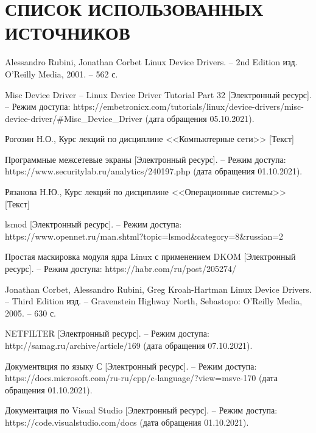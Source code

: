 \section*{СПИСОК ИСПОЛЬЗОВАННЫХ ИСТОЧНИКОВ}

\begin{thebibliography}{9}
	 Alessandro Rubini, Jonathan Corbet Linux Device Drivers. -- 2nd Edition изд. O'Reilly Media, 2001. -- 562 с.
	
	 Misc Device Driver -- Linux Device Driver Tutorial Part 32 [Электронный ресурс]. --  Режим доступа: https://embetronicx.com/tutorials/linux/device-drivers/misc-device-driver/\#Misc\_Device\_Driver (дата обращения 05.10.2021).
	
	 Рогозин Н.О., Курс лекций по дисциплине <<Компьютерные сети>> [Текст]
	
	 Программные межсетевые экраны [Электронный ресурс]. -- Режим доступа: https://www.securitylab.ru/analytics/240197.php (дата обращения 01.10.2021).
	
	 Рязанова Н.Ю., Курс лекций по дисциплине <<Операционные системы>> [Текст]
	
	 lsmod [Электронный ресурс]. -- Режим доступа: https://www.opennet.ru/man.shtml?topic=lsmod\&category=8\&russian=2
	
	 Простая маскировка модуля ядра Linux с применением DKOM [Электронный ресурс]. -- Режим доступа: https://habr.com/ru/post/205274/
	
	 Jonathan Corbet, Alessandro Rubini, Greg Kroah-Hartman Linux Device Drivers. -- Third Edition изд. --  Gravenstein Highway North, Sebastopo:  O’Reilly Media, 2005. -- 630 с.
	
	 NETFILTER [Электронный ресурс]. -- Режим доступа: http://samag.ru/archive/article/169 (дата обращения 07.10.2021).
	
	 Документвция по языку С [Электронный ресурс]. -- Режим доступа: https://docs.microsoft.com/ru-ru/cpp/c-language/?view=msvc-170 (дата обращения 01.10.2021).
	
	 Документация по Visual Studio [Электронный ресурс]. -- Режим доступа:  https://code.visualstudio.com/docs (дата обращения 01.10.2021).
	
\end{thebibliography}
		
		
